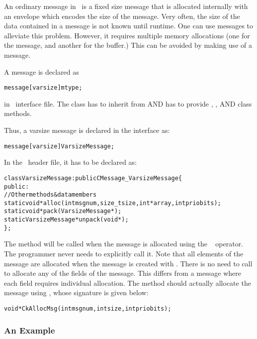 An ordinary message in \charmpp\ is a fixed size message that is allocated
internally with an envelope which encodes the size of the message. Very often,
the size of the data contained in a message is not known until runtime. One can
use  messages to alleviate this problem.
However, it requires multiple memory allocations (one for the message, and
another for the buffer.) This can be avoided by making use of a 
message.

A  message is declared as 

\begin{alltt}
  message [varsize] mtype;
\end{alltt}

in \charmpp\ interface file. The class  has to inherit from
 AND has to provide , , AND 
class methods.

Thus, a varsize message is declared in the interface as: 

\begin{alltt}
message [varsize] VarsizeMessage; 
\end{alltt}

In the \CC\ header file, it has to be declared as: 

\begin{alltt}
class VarsizeMessage : public CMessage_VarsizeMessage \{ 
  public:
    // Other methods & data members 
    static void* alloc(int msgnum, size_t size, int* array, int priobits);
    static void* pack(VarsizeMessage*);
    static VarsizeMessage* unpack(void*);
\}; 
\end{alltt}

The  method will be called when the message is allocated using the
\CC\  operator. The programmer never needs to explicitly call it.  Note
that all elements of the message are allocated when the message is created with
.  There is no need to call  to allocate any of the fields of
the message.  This differs from a  message where each field requires
individual allocation.     The  method should actually allocate the
message using , whose signature is given below:

\begin{alltt}
void *CkAllocMsg(int msgnum, int size, int priobits); 
\end{alltt}  

\subsubsection{An Example}


